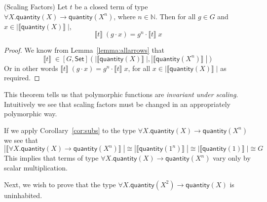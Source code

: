 \documentclass[a4paper,UKenglish]{lipics}
\newcommand{\msf}[1]{\mathsf{#1}} %
\newcommand{\Set}{\msf{Set}}
\newcommand{\GroupSet}[1]{[#1,\Set]}
\newcommand{\GSet}{\GroupSet{G}}
\newcommand{\sem}[1]{\ensuremath{\llbracket #1 \rrbracket} \;}
\newcommand{\qnt}{\msf{quantity}}
\begin{document}
\begin{theorem}(Scaling Factors)
\label{thm:ScalFact}
Let $t$ be a closed term of type $\forall X. \qnt(X) \rightarrow \qnt(X^n)$, where $n\in \mathbb{N}$. Then for all $g \in G$ and $x \in |\sem{\qnt(X)}|$,
\[
\sem{t} (g \cdot x) = g^n \cdot \sem{t} x
\]
\end{theorem}
\begin{proof}
We know from Lemma~\ref{lemma:allarrows} that
\[
\sem{t} \in \GSet(|\sem{\qnt(X)}|,|\sem{\qnt(X^n)}|)
\]
Or in other words $\sem{t} (g \cdot x) = g^n \cdot \sem{t} x$, for all $x \in |\sem{\qnt(X)}|$ as required.
\end{proof}
This theorem tells us that polymorphic functions are \emph{invariant under scaling}. Intuitively we see that scaling factors must be changed in an appropriately polymorphic way.

If we apply Corollary~\ref{cor:subs} to the type $\forall X. \qnt(X)\rightarrow \qnt(X^n)$ we see that
\[
 |\sem{\forall X. \qnt(X)\rightarrow \qnt(X^n)}| \cong |\sem{\qnt(1^n)}| \cong |\sem{\qnt(1)}| \cong G
\]
This implies that terms of type $\forall X. \qnt(X)\rightarrow \qnt(X^n)$ vary only by scalar multiplication.


Next, we wish to prove that the type  $\forall X . \qnt(X^2) \rightarrow \qnt(X)$ is uninhabited.
\end{document}
